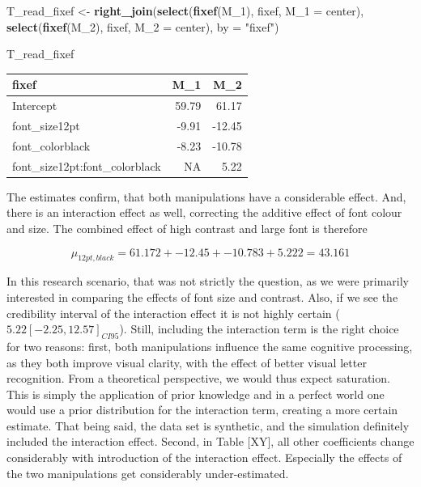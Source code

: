 \documentclass[]{svmono}
\newenvironment{Shaded}{\begin{snugshade}}{\end{snugshade}}
\newcommand{\KeywordTok}[1]{\textcolor[rgb]{0.13,0.29,0.53}{\textbf{#1}}}
\newcommand{\DataTypeTok}[1]{\textcolor[rgb]{0.13,0.29,0.53}{#1}}
\newcommand{\DecValTok}[1]{\textcolor[rgb]{0.00,0.00,0.81}{#1}}
\newcommand{\StringTok}[1]{\textcolor[rgb]{0.31,0.60,0.02}{#1}}
\newcommand{\NormalTok}[1]{#1}
\begin{document}
\begin{Shaded}
\begin{Highlighting}[]
\NormalTok{T_read_fixef <-}
\StringTok{  }\KeywordTok{right_join}\NormalTok{(}\KeywordTok{select}\NormalTok{(}\KeywordTok{fixef}\NormalTok{(M_}\DecValTok{1}\NormalTok{), fixef, }\DataTypeTok{M_1 =}\NormalTok{ center),}
             \KeywordTok{select}\NormalTok{(}\KeywordTok{fixef}\NormalTok{(M_}\DecValTok{2}\NormalTok{), fixef, }\DataTypeTok{M_2 =}\NormalTok{ center),}
             \DataTypeTok{by =} \StringTok{"fixef"}\NormalTok{)}

\NormalTok{T_read_fixef}
\end{Highlighting}
\end{Shaded}

\begin{longtable}[]{@{}lrr@{}}
\toprule
fixef & M\_1 & M\_2\tabularnewline
\midrule
\endhead
Intercept & 59.79 & 61.17\tabularnewline
font\_size12pt & -9.91 & -12.45\tabularnewline
font\_colorblack & -8.23 & -10.78\tabularnewline
font\_size12pt:font\_colorblack & NA & 5.22\tabularnewline
\bottomrule
\end{longtable}

The estimates confirm, that both manipulations have a considerable
effect. And, there is an interaction effect as well, correcting the
additive effect of font colour and size. The combined effect of high
contrast and large font is therefore

\[
\mu_{12pt, black} =
61.172 + -12.45 + 
-10.783 + 5.222 = 
43.161
\]

In this research scenario, that was not strictly the question, as we
were primarily interested in comparing the effects of font size and
contrast. Also, if we see the credibility interval of the interaction
effect it is not highly certain (\(5.22 [-2.25, 12.57]_{CI95}\)). Still,
including the interaction term is the right choice for two reasons:
first, both manipulations influence the same cognitive processing, as
they both improve visual clarity, with the effect of better visual
letter recognition. From a theoretical perspective, we would thus expect
saturation. This is simply the application of prior knowledge and in a
perfect world one would use a prior distribution for the interaction
term, creating a more certain estimate. That being said, the data set is
synthetic, and the simulation definitely included the interaction
effect. Second, in Table {[}XY{]}, all other coefficients change
considerably with introduction of the interaction effect. Especially the
effects of the two manipulations get considerably under-estimated.
\end{document}
